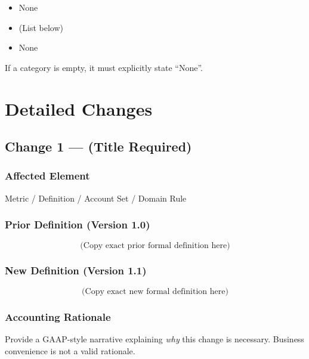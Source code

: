 \documentclass[11pt]{article}
\newcommand{\OldVersion}{1.0}
\newcommand{\NewVersion}{1.1}
\begin{document}
\begin{itemize}
  \item[\textbf{Added:}] None
  \item[\textbf{Modified:}] (List below)
  \item[\textbf{Removed:}] None
\end{itemize}

If a category is empty, it must explicitly state ``None''.

\section{Detailed Changes}

\subsection{Change 1 — (Title Required)}

\subsubsection*{Affected Element}
Metric / Definition / Account Set / Domain Rule

\subsubsection*{Prior Definition (Version \OldVersion{})}
\begin{equation*}
\text{(Copy exact prior formal definition here)}
\end{equation*}

\subsubsection*{New Definition (Version \NewVersion{})}
\begin{equation*}
\text{(Copy exact new formal definition here)}
\end{equation*}

\subsubsection*{Accounting Rationale}
Provide a GAAP-style narrative explaining \emph{why} this change is
necessary. Business convenience is not a valid rationale.
\end{document}
